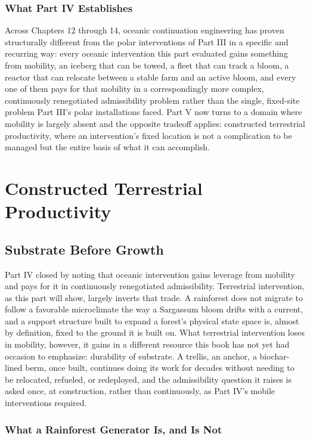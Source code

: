 \documentclass[11pt,oneside]{book}
\begin{document}
\section*{What Part IV Establishes}

Across Chapters 12 through 14, oceanic continuation engineering has proven structurally different from the polar interventions of Part III in a specific and recurring way: every oceanic intervention this part evaluated gains something from mobility, an iceberg that can be towed, a fleet that can track a bloom, a reactor that can relocate between a stable farm and an active bloom, and every one of them pays for that mobility in a correspondingly more complex, continuously renegotiated admissibility problem rather than the single, fixed-site problem Part III's polar installations faced. Part V now turns to a domain where mobility is largely absent and the opposite tradeoff applies: constructed terrestrial productivity, where an intervention's fixed location is not a complication to be managed but the entire basis of what it can accomplish.

\part{Constructed Terrestrial Productivity}

\chapter{Substrate Before Growth}

Part IV closed by noting that oceanic intervention gains leverage from mobility and pays for it in continuously renegotiated admissibility. Terrestrial intervention, as this part will show, largely inverts that trade. A rainforest does not migrate to follow a favorable microclimate the way a Sargassum bloom drifts with a current, and a support structure built to expand a forest's physical state space is, almost by definition, fixed to the ground it is built on. What terrestrial intervention loses in mobility, however, it gains in a different resource this book has not yet had occasion to emphasize: durability of substrate. A trellis, an anchor, a biochar-lined berm, once built, continues doing its work for decades without needing to be relocated, refueled, or redeployed, and the admissibility question it raises is asked once, at construction, rather than continuously, as Part IV's mobile interventions required.

\section*{What a Rainforest Generator Is, and Is Not}
\end{document}
